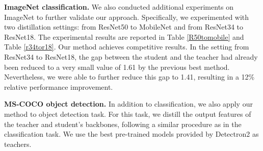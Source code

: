 \documentclass[letterpaper]{article} %
\begin{document}
\noindent\textbf{ImageNet classification.} We also conducted additional experiments on ImageNet to further validate our approach. Specifically, we experimented with two distillation settings: from ResNet50 to MobileNet and from ResNet34 to ResNet18. The experimental results are reported in Table \ref{R50tomobile} and Table \ref{r34tor18}. Our method achieves competitive results. In the setting from ResNet34 to ResNet18, the gap between the student and the teacher had already been reduced to a very small value of 1.61 by the previous best method. Nevertheless, we were able to further reduce this gap to 1.41, resulting in a 12\% relative performance improvement.

\noindent\textbf{MS-COCO object detection.} In addition to classification, we also apply our method to object detection task. For this task, we distill the output features of the teacher and student's backbones, following a similar procedure as in the classification task. We use the best pre-trained models provided by Detectron2 as teachers.
\end{document}
